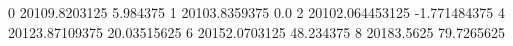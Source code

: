 0 20109.8203125 5.984375
1 20103.8359375 0.0
2 20102.064453125 -1.771484375
4 20123.87109375 20.03515625
6 20152.0703125 48.234375
8 20183.5625 79.7265625
